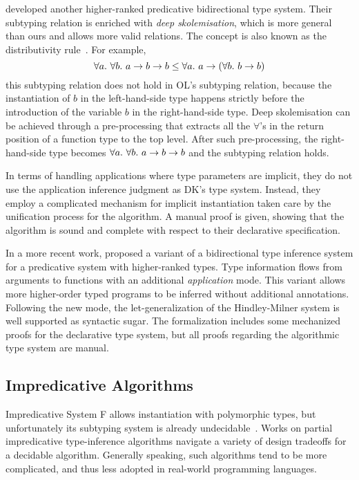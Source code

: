 \citet{jones2007practical} developed another higher-ranked predicative bidirectional type system.
Their subtyping relation is enriched with \emph{deep skolemisation},
which is more general than ours and allows more valid relations.
The concept is also known as the distributivity rule~\citep{Mitchell1984}.
For example,
$$\all{\all[b] a \to b \to b} \le \all a \to (\all[b] b \to b)$$
this subtyping relation does not hold in OL's subtyping relation,
because the instantiation of $b$ in the left-hand-side type
happens strictly before the introduction of
the variable $b$ in the right-hand-side type.
Deep skolemisation can be achieved through
a pre-processing that extracts all the $\forall$'s
in the return position of a function type to the top level.
After such pre-processing, the right-hand-side type becomes
$\all {\all[b] a \to b \to b}$ and the subtyping relation holds.

In terms of handling applications where type parameters are implicit,
they do not use the application inference judgment as DK's type system.
Instead, they employ a complicated mechanism for implicit instantiation
taken care by the unification process for the algorithm.
A manual proof is given, showing that the algorithm is sound and
complete with respect to their declarative specification.

In a more recent work, \citet{xie2018letarguments} proposed a variant of a
bidirectional type inference system for a predicative system with higher-ranked types.
Type information flows from arguments to
functions with an additional \emph{application} mode. This variant 
allows more higher-order typed programs to be inferred without additional annotations.
Following the new mode, the let-generalization of the Hindley-Milner system
is well supported as syntactic sugar. The formalization includes some
mechanized proofs for the declarative type system, but all proofs regarding
the algorithmic type system are manual.

\subsection{Impredicative Algorithms}

Impredicative System F allows instantiation with polymorphic types,
but unfortunately its subtyping system is already undecidable~\citep{chrzaszcz1998poly}.
Works on partial impredicative type-inference algorithms
navigate a variety of design tradeoffs for a decidable algorithm.
Generally speaking, such algorithms tend to be more complicated,
and thus less adopted in real-world programming languages.

